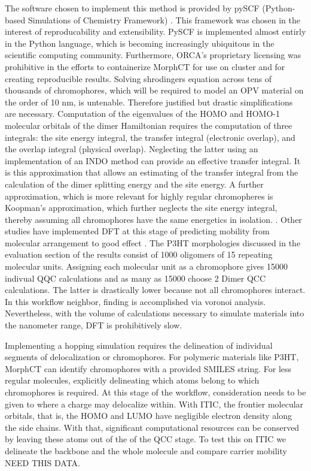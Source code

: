 The software chosen to implement this method is
provided by pySCF (Python-based Simulations of Chemistry Framework) \cite{Sun2018a}. This framework
was chosen in the interest of reproducability and extensibility. PySCF is implemented almost entirly in the Python 
language, which is becoming increasingly ubiquitous in the scientific computing community. Furthermore,
ORCA's proprietary licensing was prohibitive in the efforts to containerize MorphCT for use on cluster and for
creating reproducible results. 
Solving shrodingers equation across tens of thousands of 
chromophores, which will be required to model an OPV material on the order of 10 nm, is untenable. Therefore
justified but drastic simplifications are necessary. Computation of the eigenvalues of the HOMO and HOMO-1
molecular orbitals of the dimer Hamiltonian requires the computation of three integrals: 
the site energy integral, the transfer integral (electronic overlap), and the overlap integral (physical
overlap). Neglecting the latter using an implementation of an INDO method can provide an effective transfer
integral. It is this approximation that allows an estimating of the transfer integral from the calculation of
the dimer splitting energy and the site energy. A further approximation, which is more relevant for highly regular chromopheres is Koopman's
approximation, which further neglects the site energy integral, thereby assuming all chromophores have the same
energetics in isolation.  \cite{Huang2005b}. Other studies have implemented DFT at this stage of predicting
mobility from molecular arrangement to good effect \cite{Deng2004}. The P3HT morphologies discussed in the evaluation section of the results
consist of 1000 oligomers of 15 repeating molecular units. Assigning each molecular unit as a chromophore
gives 15000 indivual QQC calculations and as many as 15000 choose 2 Dimer QCC calculations. The latter is
drastically lower because not all chromophores interact. In this workflow neighbor, finding is accomplished via
voronoi analysis. Nevertheless, with the volume of calculations necessary to simulate materials into the
nanometer range, DFT is prohibitively slow. 

 Implementing a hopping simulation requires the delineation of
individual segments of delocalization or chromophores. For polymeric materials like P3HT, MorphCT
can identify chromophores with a provided SMILES string. For less regular molecules, explicitly delineating
which atoms belong to which chromophores is required. At this stage of the workflow, consideration needs to be
given to where a charge may delocalize within. With ITIC, the frontier molecular orbitals, that is, the HOMO
and LUMO have negligible electron density along the side chains. With that, significant computational resources
can be conserved by leaving these atoms out of the of the QCC stage. To test this on ITIC we delineate the
backbone and the whole molecule and compare carrier mobility NEED THIS DATA. 



